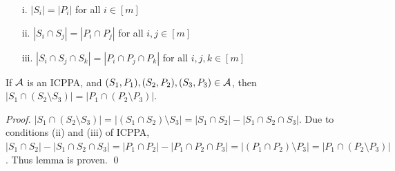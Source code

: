 \documentclass[MS]             %
              {iitmdiss_as}    %
\begin{document}
\begin{enumerate}
\item [i.]  $|S_i| = |P_i|$ for all $i \in [m]$
\item [ii.] $|S_i \cap S_j| = |P_i \cap P_j|$ for all $i,j \in [m]$
\item [iii.] $|S_i \cap S_j \cap S_k| = |P_i \cap P_j \cap P_k|$ for
  all $i,j,k \in [m]$
\end{enumerate}

\begin{lemma}
  \label{lem:setminuscard}
  If ${\cal A}$ is an ICPPA, and $(S_1, P_1),(S_2, P_2),(S_3, P_3) \in
  {\cal A}$, then $|S_1 \cap (S_2 \setminus S_3)| = |P_1 \cap (P_2
  \setminus P_3)|$.
\end{lemma}
\begin{proof}
  $|S_1 \cap (S_2 \setminus S_3)| = |(S_1 \cap S_2) \setminus S_3| =
  |S_1 \cap S_2| - |S_1 \cap S_2 \cap S_3|$. Due to conditions (ii)
  and (iii) of ICPPA, $|S_1 \cap S_2| - |S_1 \cap S_2 \cap S_3| = |P_1
  \cap P_2| - |P_1 \cap P_2 \cap P_3| = |(P_1 \cap P_2) \setminus P_3|
  = |P_1 \cap (P_2 \setminus P_3)|$. Thus lemma is proven. \qed
\end{proof}
\end{document}
